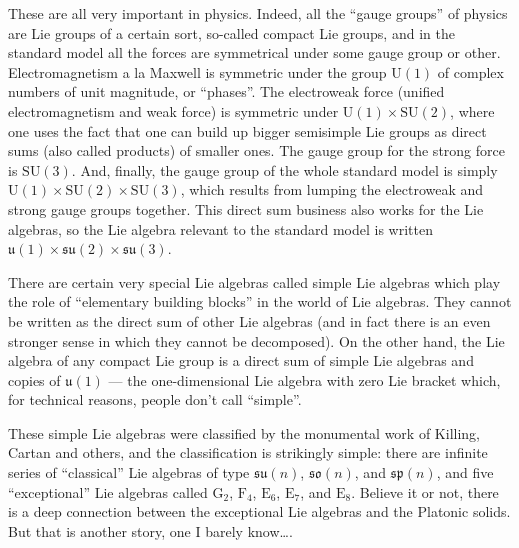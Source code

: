 \documentclass[12pt]{article}
\begin{document}
These are all very important in physics. Indeed, all the ``gauge
groups'' of physics are Lie groups of a certain sort, so-called compact
Lie groups, and in the standard model all the forces are symmetrical
under some gauge group or other. Electromagnetism a la Maxwell is
symmetric under the group \(\mathrm{U}(1)\) of complex numbers of unit
magnitude, or ``phases''. The electroweak force (unified
electromagnetism and weak force) is symmetric under
\(\mathrm{U}(1) \times \mathrm{SU}(2)\), where one uses the fact that
one can build up bigger semisimple Lie groups as direct sums (also
called products) of smaller ones. The gauge group for the strong force
is \(\mathrm{SU}(3)\). And, finally, the gauge group of the whole
standard model is simply
\(\mathrm{U}(1) \times \mathrm{SU}(2) \times \mathrm{SU}(3)\), which
results from lumping the electroweak and strong gauge groups together.
This direct sum business also works for the Lie algebras, so the Lie
algebra relevant to the standard model is written
\(\mathfrak{u}(1) \times \mathfrak{su}(2) \times \mathfrak{su}(3)\).

There are certain very special Lie algebras called simple Lie algebras
which play the role of ``elementary building blocks'' in the world of
Lie algebras. They cannot be written as the direct sum of other Lie
algebras (and in fact there is an even stronger sense in which they
cannot be decomposed). On the other hand, the Lie algebra of any compact
Lie group is a direct sum of simple Lie algebras and copies of
\(\mathfrak{u}(1)\) --- the one-dimensional Lie algebra with zero Lie
bracket which, for technical reasons, people don't call ``simple''.

These simple Lie algebras were classified by the monumental work of
Killing, Cartan and others, and the classification is strikingly simple:
there are infinite series of ``classical'' Lie algebras of type
\(\mathfrak{su}(n)\), \(\mathfrak{so}(n)\), and \(\mathfrak{sp}(n)\),
and five ``exceptional'' Lie algebras called \(\mathrm{G}_2\),
\(\mathrm{F}_4\), \(\mathrm{E}_6\), \(\mathrm{E}_7\), and
\(\mathrm{E}_8\). Believe it or not, there is a deep connection between
the exceptional Lie algebras and the Platonic solids. But that is
another story, one I barely know\ldots.
\end{document}
